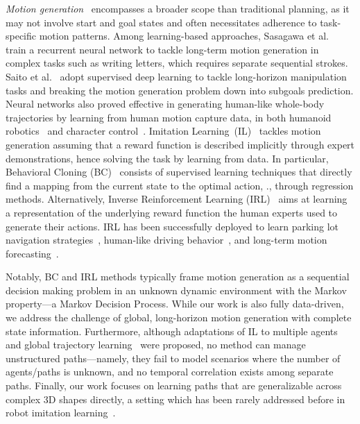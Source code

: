 %
\emph{Motion generation}~\cite{bekris2024motiongensurvey} encompasses a broader scope than traditional planning, as it may not involve start and goal states and often necessitates adherence to task-specific motion patterns. 
% 
Among learning-based approaches, Sasagawa et al.~\cite{sasagawa2021motionbilateral} train a recurrent neural network to tackle long-term motion generation in complex tasks such as writing letters, which requires separate sequential strokes.
Saito et al.~\cite{saito2023structured} adopt supervised deep learning to tackle long-horizon manipulation tasks 
and breaking the motion generation problem down into subgoals prediction. 
Neural networks also proved effective in generating human-like whole-body trajectories by learning from human motion capture data, in both humanoid robotics~\cite{viceconte2022adherent} and character control~\cite{zhang2018mode}.
%
%
Imitation Learning~(IL)~\cite{ross2011reductionbc,behav_cloning,ho2016gail,panilautonomousdriving,Ze2024DP3diffusionpolicy} tackles motion generation assuming that a reward function is described implicitly through expert demonstrations, hence solving the task by learning from data.
%
In particular, Behavioral Cloning (BC)~\cite{ross2011reductionbc,behav_cloning} consists of supervised learning techniques that directly find a mapping from the current state to the optimal action, \eg., through regression methods.
Alternatively, Inverse Reinforcement Learning (IRL)~\cite{abbeel2004apprenticeshipirl,ziebart2008maximumirl} aims at learning a representation of the underlying reward function the human experts used to generate their actions. IRL has been successfully deployed to learn parking lot navigation strategies~\cite{abbeel2008apprenticeshipirlplanning}, human-like driving behavior~\cite{wulfmeier2016watchirlpathplanning}, and long-term motion forecasting~\cite{shkurti2018modelpursuit}. 
%

Notably, BC and IRL methods typically frame motion generation as a sequential decision making problem in an unknown dynamic environment with the Markov property---a Markov Decision Process. While our work is also fully data-driven, we address the challenge of global, long-horizon motion generation with complete state information.
%
Furthermore, although adaptations of IL to multiple agents~\cite{SRINIVASAN2021598} and global trajectory learning~\cite{osa2017guiding,duan2024structured,behav_cloning} were proposed, no method can manage unstructured paths---namely, they fail to model scenarios where the number of agents/paths is unknown, and no temporal correlation exists among separate paths.
%
Finally, our work focuses on learning paths that are generalizable across complex 3D shapes directly, a setting which has been rarely addressed before in robot imitation learning~\cite{schulman2016,Ze2024DP3diffusionpolicy}.



